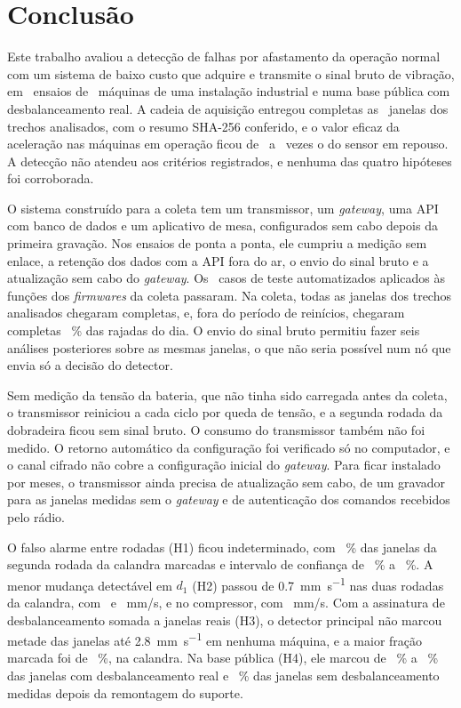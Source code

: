 \chapter{Conclusão}\label{cap:conclusao}

Este trabalho avaliou a detecção de falhas por afastamento da operação normal com um sistema de baixo custo que adquire e transmite o sinal bruto de vibração, em \campoEnsaios\ ensaios de \campoMaquinas\ máquinas de uma instalação industrial e numa base pública com desbalanceamento real. A cadeia de aquisição entregou completas as \campoJanelas\ janelas dos trechos analisados, com o resumo SHA-256 conferido, e o valor eficaz da aceleração nas máquinas em operação ficou de \sinalRazaoMin\ a \sinalRazaoMax\ vezes o do sensor em repouso. A detecção não atendeu aos critérios registrados, e nenhuma das quatro hipóteses foi corroborada.

O sistema construído para a coleta tem um transmissor, um \textit{gateway}, uma API com banco de dados e um aplicativo de mesa, configurados sem cabo depois da primeira gravação. Nos ensaios de ponta a ponta, ele cumpriu a medição sem enlace, a retenção dos dados com a API fora do ar, o envio do sinal bruto e a atualização sem cabo do \textit{gateway}. Os \sisTestesCampoCasos\ casos de teste automatizados aplicados às funções dos \textit{firmwares} da coleta passaram. Na coleta, todas as janelas dos trechos analisados chegaram completas, e, fora do período de reinícios, chegaram completas \rajadasForaPct~\% das rajadas do dia. O envio do sinal bruto permitiu fazer seis análises posteriores sobre as mesmas janelas, o que não seria possível num nó que envia só a decisão do detector.

Sem medição da tensão da bateria, que não tinha sido carregada antes da coleta, o transmissor reiniciou a cada ciclo por queda de tensão, e a segunda rodada da dobradeira ficou sem sinal bruto. O consumo do transmissor também não foi medido. O retorno automático da configuração foi verificado só no computador, e o canal cifrado não cobre a configuração inicial do \textit{gateway}. Para ficar instalado por meses, o transmissor ainda precisa de atualização sem cabo, de um gravador para as janelas medidas sem o \textit{gateway} e de autenticação dos comandos recebidos pelo rádio.

O falso alarme entre rodadas (H1) ficou indeterminado, com \hUmCalandraIFDireto~\% das janelas da segunda rodada da calandra marcadas e intervalo de confiança de \hUmCalandraIFDiretoInf~\% a \hUmCalandraIFDiretoSup~\%. A menor mudança detectável em $d_1$ (H2) passou de \SI{0,7}{\milli\meter\per\second} nas duas rodadas da calandra, com \hDoisMmdCalandraUm\ e \hDoisMmdCalandraDois~mm/s, e no compressor, com \hDoisMmdCompressorUm~mm/s. Com a assinatura de desbalanceamento somada a janelas reais (H3), o detector principal não marcou metade das janelas até \SI{2,8}{\milli\meter\per\second} em nenhuma máquina, e a maior fração marcada foi de \hTresFracaoMaxCalandra~\%, na calandra. Na base pública (H4), ele marcou de \hQuatroFracaoTres~\% a \hQuatroFracaoQuatro~\% das janelas com desbalanceamento real e \hQuatroFracaoZero~\% das janelas sem desbalanceamento medidas depois da remontagem do suporte.

